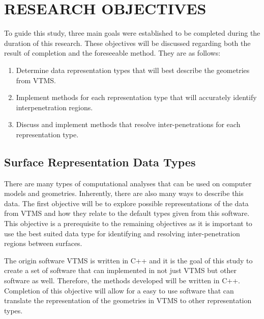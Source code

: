 %
%
%
%



\chapter{RESEARCH OBJECTIVES}

To guide this study, three main goals were established to be completed during the duration of this research. These objectives will be discussed regarding both the result of completion and the foreseeable method. They are as follows:
\begin{enumerate}
\item Determine data representation types that will best describe the geometries from VTMS.
\item Implement methods for each representation type that will accurately identify interpenetration regions.
\item Discuss and implement methods that resolve inter-penetrations for each representation type.
\end{enumerate}

\section{Surface Representation Data Types}
There are many types of computational analyses that can be used on computer models and geometries. Inherently, there are also many ways to describe this data. The first objective will be to explore possible representations of the data from VTMS and how they relate to the default types given from this software. This objective is a prerequisite to the remaining objectives as it is important to use the best suited data type for identifying and resolving inter-penetration regions between surfaces.

The origin software VTMS is written in C++ and it is the goal of this study to create a set of software that can implemented in not just VTMS but other software as well. Therefore, the methods developed will be written in C++. Completion of this objective will allow for a easy to use software that can translate  the representation of the geometries in VTMS to other representation types.

